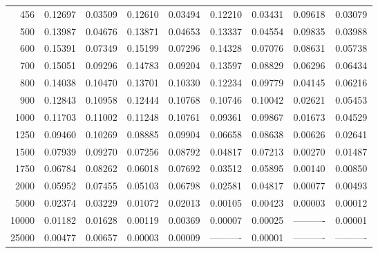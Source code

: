 \begin{table}[ht]
\begin{tabular}{r|c|c|c|c|c|c|c|c}
      456 & 0.12697 & 0.03509 & 0.12610 & 0.03494 & 0.12210 & 0.03431 & 0.09618 & 0.03079 \\
      500 & 0.13987 & 0.04676 & 0.13871 & 0.04653 & 0.13337 & 0.04554 & 0.09835 & 0.03988 \\
      600 & 0.15391 & 0.07349 & 0.15199 & 0.07296 & 0.14328 & 0.07076 & 0.08631 & 0.05738 \\
      700 & 0.15051 & 0.09296 & 0.14783 & 0.09204 & 0.13597 & 0.08829 & 0.06296 & 0.06434 \\
      800 & 0.14038 & 0.10470 & 0.13701 & 0.10330 & 0.12234 & 0.09779 & 0.04145 & 0.06216 \\
      900 & 0.12843 & 0.10958 & 0.12444 & 0.10768 & 0.10746 & 0.10042 & 0.02621 & 0.05453 \\
     1000 & 0.11703 & 0.11002 & 0.11248 & 0.10761 & 0.09361 & 0.09867 & 0.01673 & 0.04529 \\
     1250 & 0.09460 & 0.10269 & 0.08885 & 0.09904 & 0.06658 & 0.08638 & 0.00626 & 0.02641 \\
     1500 & 0.07939 & 0.09270 & 0.07256 & 0.08792 & 0.04817 & 0.07213 & 0.00270 & 0.01487 \\
     1750 & 0.06784 & 0.08262 & 0.06018 & 0.07692 & 0.03512 & 0.05895 & 0.00140 & 0.00850 \\
     2000 & 0.05952 & 0.07455 & 0.05103 & 0.06798 & 0.02581 & 0.04817 & 0.00077 & 0.00493 \\
     5000 & 0.02374 & 0.03229 & 0.01072 & 0.02013 & 0.00105 & 0.00423 & 0.00003 & 0.00012 \\
    10000 & 0.01182 & 0.01628 & 0.00119 & 0.00369 & 0.00007 & 0.00025 & ---------- & 0.00001 \\
    25000 & 0.00477 & 0.00657 & 0.00003 & 0.00009 & ---------- & 0.00001 & ---------- & ---------- \\ \cline{1-9}
    \end{tabular}
    \label{tab:XRayEffOCX2}
\end{table}

